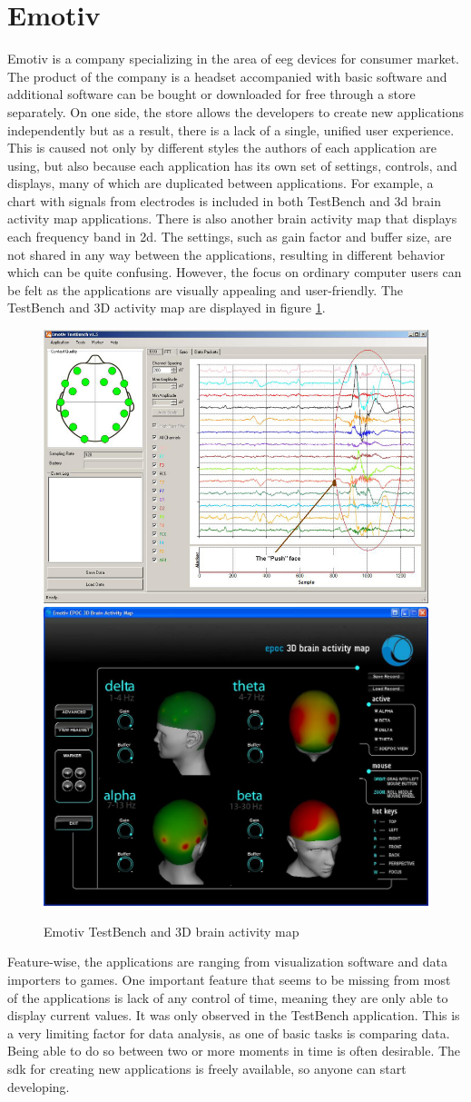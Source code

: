 \section{Emotiv}
Emotiv is a company specializing in the area of \gls{eeg} devices for consumer market.
The product of the company is a headset accompanied with basic software and additional software can be bought or downloaded for free through a store
separately. On one side, the store allows the developers to create new
applications independently but as a result, there is a lack of a single, unified
user experience. This is caused not only by different styles the authors of each
application are using, but also because each application has its own set of
settings, controls, and displays, many of which are duplicated between
applications. For example, a chart with signals from electrodes is included in
both TestBench and \gls{3d} brain activity map applications. There is also another
brain activity map that displays each frequency band in \gls{2d}. The settings,
such as gain factor and buffer size, are not shared in any way between the
applications, resulting in different behavior which can be quite confusing.
However, the focus on ordinary computer users can be felt as the applications
are visually appealing and user-friendly. The TestBench and 3D activity map are displayed in figure \ref{fig:emotivTest}. 

\begin{figure}[htbp]
	\centering
	\includegraphics[width=0.47\linewidth]{fig/emotivTest.jpg}
	\includegraphics[width=0.47\linewidth]{fig/epoc3d.jpg}
	\caption[Caption for LOF]{Emotiv TestBench and 3D brain activity map\protect\footnotemark}
	\label{fig:emotivTest}
\end{figure}
Feature-wise, the applications are ranging from visualization software and data
importers to games. One important feature that seems to be missing from most of
the applications is lack of any control of time, meaning they are only able to
display current values. It was only observed in the TestBench application. This is a very limiting factor for data analysis, as one of
basic tasks is comparing data. Being able to do so between two or more
moments in time is often desirable. The \gls{sdk} for creating new applications
is freely available, so anyone can start developing.


